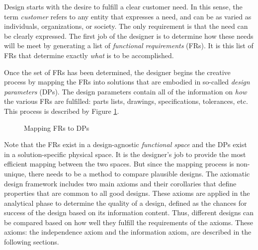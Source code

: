 Design starts with the desire to fulfill a clear customer need.  In this sense, the term \emph{customer} refers to
any entity that expresses a need, and can be as varied as individuals, organizations, or society.  The only
requirement is that the need can be clearly expressed.  The first job of the designer is to determine how these
needs will be meet by generating a list of \emph{functional requirements} (FRs).  It is this list of FRs that
determine exactly \emph{what} is to be accomplished.

Once the set of FRs has been determined, the designer begins the creative process by mapping the FRs into solutions
that are embodied in so-called \emph{design parameters} (DPs).  The design parameters contain all of the
information on \emph{how} the various FRs are fulfilled: parts lists, drawings, specifications, tolerances, etc.
This process is described by Figure \ref{fig:mapping}.

\begin{figure}[h]
  \label{fig:mapping}
  \begin{center}
  \end{center}
  \caption{Mapping FRs to DPs}
\end{figure}

Note that the FRs exist in a design-agnostic \emph{functional space} and the DPs exist in a solution-specific
physical space.  It is the designer's job to provide the most efficient mapping between the two spaces.  But since
the mapping process is non-unique, there needs to be a method to compare plausible designs.  The axiomatic design
framework includes two main axioms and their corollaries that define properties that are common to all good
designs.  These axioms are applied in the analytical phase to determine the quality of a design, defined as the
chances for success of the design based on its information content.  Thus, different designs can be compared based
on how well they fulfill the requirements of the axioms.  These axioms: the independence axiom and the information
axiom, are described in the following sections.

